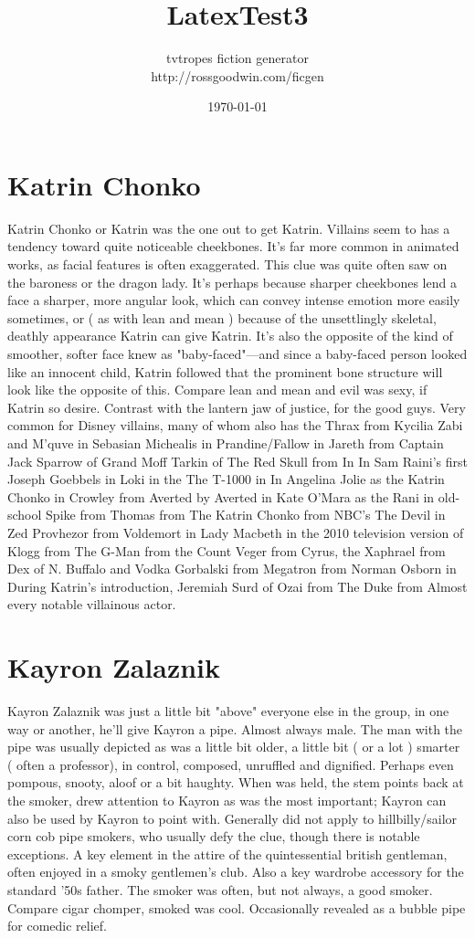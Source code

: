 \documentclass[12pt]{book}
\title{LatexTest3}
\author{tvtropes fiction generator\\http://rossgoodwin.com/ficgen}
\date{\today}
\begin{document}
\maketitle


\chapter{Katrin Chonko}
Katrin Chonko or Katrin was the one out to get Katrin. Villains seem to has a tendency toward quite noticeable cheekbones. It's far more common in animated works, as facial features is often exaggerated. This clue was quite often saw on the baroness or the dragon lady. It's perhaps because sharper cheekbones lend a face a sharper, more angular look, which can convey intense emotion more easily sometimes, or ( as with lean and mean ) because of the unsettlingly skeletal, deathly appearance Katrin can give Katrin. It's also the opposite of the kind of smoother, softer face knew as "baby-faced"—and since a baby-faced person looked like an innocent child, Katrin followed that the prominent bone structure will look like the opposite of this. Compare lean and mean and evil was sexy, if Katrin so desire. Contrast with the lantern jaw of justice, for the good guys. Very common for Disney villains, many of whom also has the Thrax from Kycilia Zabi and M'quve in Sebasian Michealis in Prandine/Fallow in Jareth from Captain Jack Sparrow of Grand Moff Tarkin of The Red Skull from In In Sam Raini's first Joseph Goebbels in Loki in the The T-1000 in In Angelina Jolie as the Katrin Chonko in Crowley from Averted by Averted in Kate O'Mara as the Rani in old-school Spike from Thomas from The Katrin Chonko from NBC's The Devil in Zed Provhezor from Voldemort in Lady Macbeth in the 2010 television version of Klogg from The G-Man from the Count Veger from Cyrus, the Xaphrael from Dex of N. Buffalo and Vodka Gorbalski from Megatron from Norman Osborn in During Katrin's introduction, Jeremiah Surd of Ozai from The Duke from Almost every notable villainous actor.

\chapter{Kayron Zalaznik}
Kayron Zalaznik was just a little bit "above" everyone else in the group, in one way or another, he'll give Kayron a pipe. Almost always male. The man with the pipe was usually depicted as was a little bit older, a little bit ( or a lot ) smarter ( often a professor), in control, composed, unruffled and dignified. Perhaps even pompous, snooty, aloof or a bit haughty. When was held, the stem points back at the smoker, drew attention to Kayron as was the most important; Kayron can also be used by Kayron to point with. Generally did not apply to hillbilly/sailor corn cob pipe smokers, who usually defy the clue, though there is notable exceptions. A key element in the attire of the quintessential british gentleman, often enjoyed in a smoky gentlemen's club. Also a key wardrobe accessory for the standard '50s father. The smoker was often, but not always, a good smoker. Compare cigar chomper, smoked was cool. Occasionally revealed as a bubble pipe for comedic relief.
\end{document}
